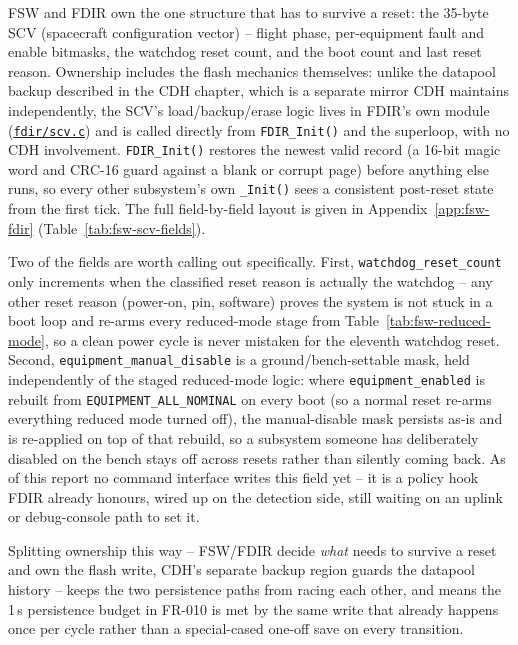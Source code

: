 FSW and FDIR own the one structure that has to survive a reset: the
35-byte SCV (spacecraft configuration vector) -- flight phase, per-equipment
fault and enable bitmasks, the watchdog reset count, and the boot count and
last reset reason. Ownership includes the flash mechanics themselves:
unlike the datapool backup described in the CDH chapter, which is a
separate mirror CDH maintains independently, the SCV's load/backup/erase
logic lives in FDIR's own module
(\href{\repourl/blob/main/firmware-stm32/Core/Src/fdir/scv.c}{\texttt{fdir/scv.c}}) and is called
directly from \texttt{FDIR\_Init()} and the superloop, with no CDH
involvement. \texttt{FDIR\_Init()} restores the newest valid record (a
16-bit magic word and CRC-16 guard against a blank or corrupt page) before
anything else runs, so every other subsystem's own \texttt{\_Init()} sees
a consistent post-reset state from the first tick. The full field-by-field
layout is given in Appendix~\ref{app:fsw-fdir} (Table~\ref{tab:fsw-scv-fields}).

Two of the fields are worth calling out specifically. First,
\texttt{watchdog\_reset\_count} only increments when the classified reset
reason is actually the watchdog -- any other reset reason (power-on, pin,
software) proves the system is not stuck in a boot loop and re-arms every
reduced-mode stage from Table~\ref{tab:fsw-reduced-mode}, so a clean power
cycle is never mistaken for the eleventh watchdog reset. Second,
\texttt{equipment\_manual\_disable} is a ground/bench-settable mask, held
independently of the staged reduced-mode logic: where
\texttt{equipment\_enabled} is rebuilt from \texttt{EQUIPMENT\_ALL\_NOMINAL}
on every boot (so a normal reset re-arms everything reduced mode turned
off), the manual-disable mask persists as-is and is re-applied on top of
that rebuild, so a subsystem someone has deliberately disabled on the bench
stays off across resets rather than silently coming back. As of this
report no command interface writes this field yet -- it is a policy hook
FDIR already honours, wired up on the detection side, still waiting on an
uplink or debug-console path to set it.

Splitting ownership this way -- FSW/FDIR decide \emph{what} needs to
survive a reset and own the flash write, CDH's separate backup region
guards the datapool history -- keeps the two persistence paths from racing
each other, and means the 1\,s persistence budget in FR-010 is met by the
same write that already happens once per cycle rather than a special-cased
one-off save on every transition.
